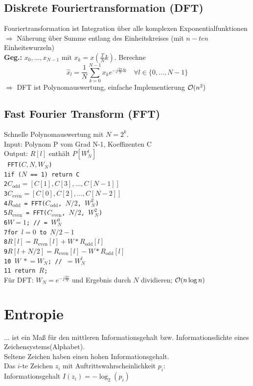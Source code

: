 \documentclass[fs, footer]{latex4ei}
\renewcommand{\t}{\texttt}
\begin{document}
\begin{multicols*}{4}
{{\subsection{Diskrete Fouriertransformation (DFT)}
Fouriertransformation ist Integration über alle komplexen Exponentialfunktionen $\Rightarrow$ Näherung über Summe entlang des Einheitskreises (mit $n-ten$ Einheitswurzeln)\\
\textbf{Geg.:} $x_0, ..., x_{N-1}$ mit $x_k = x(\frac{T}{N}k)$.
Berechne \[\hat{x}_l = \dfrac{1}{N} \sum_{k=0}^{N-1}x_ke^{-j\frac{2\pi}{N}lk}\quad\forall l \in \{0,...,N-1\}\]
$\Rightarrow$ DFT ist Polynomauswertung, einfache Implementierung $\operatorname{\mathcal O}(n^2)$
\subsection{Fast Fourier Transform (FFT)}
Schnelle Polynomauswertung mit $N=2^k$.\\
Input: Polynom P vom Grad N-1, Koeffizenten C\\
Output: $R[l]$ enthält $P[W_N^l]$\\
\t{
FFT($C,N,W_N$)\\
1\qquad if ($N$ == 1) return C\\
2\qquad $C_\text{odd} = [C[1], C[3], ..., C[N-1]]$\\
3\qquad $C_\text{even} = [C[0], C[2], ..., C[N-2]]$\\
4\qquad $R_\text{odd}$ = FFT($C_\text{odd}$, $N/2$, $W_N^2$)\\
5\qquad $R_\text{even}$ = FFT($C_\text{even}$, $N/2$, $W_N^2$)\\
6\qquad $W = 1$; // = $W_N^0$\\
7\qquad for $l = 0$ to $N/2-1$\\
8\qquad \qquad $R[l] = R_\text{even}[l] + W * R_\text{odd}[l]$\\
9\qquad \qquad $R[l + N/2] = R_\text{even}[l] - W * R_\text{odd}[l]$\\
10\quad\  \qquad $W \ *\!\!= W_N$; // $= W_N^l$\\
11\quad\  return $R$;\\}
Für DFT: $W_N = e^{-j\frac{2\pi}{N}}$ und Ergebnis durch $N$ dividieren; $\operatorname{\mathcal O}(n \log n)$

\iffalse
\section{Entropie}
... ist ein Maß für den mittleren Informationsgehalt bzw. Informationsdichte eines Zeichensystems(Alphabet).\\
Seltene Zeichen haben einen hohen Informationsgehalt.\\
Das $i$-te Zeichen $z_i$ mit Auftrittswahrscheinlichkeit $p_i$:\\
Informationsgehalt  $I(z_i) = -\log_2(p_i)$\\

}}
\end{multicols*}
\end{document}
